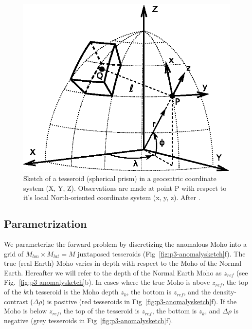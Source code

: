 \begin{figure}
    \centering
    \includegraphics{figures/paper-moho/tesseroid-coord-sys}
    \caption{Sketch of a tesseroid (spherical prism) in a geocentric coordinate
        system (X, Y, Z).
        Observations are made at point P with respect to it's local
        North-oriented coordinate system (x, y, z).
        After \citet{uieda2015}.
    }
    \label{fig:p3-tesseroid}
\end{figure}


\subsection{Parametrization}

We parameterize the forward problem by discretizing the anomalous Moho
into a grid of $M_{lon} \times M_{lat} = M$ juxtaposed tesseroids
(Fig~\ref{fig:p3-anomalysketch}f).
The true (real Earth) Moho varies in depth
with respect to the Moho of the Normal Earth.
Hereafter we will refer to the depth of the Normal Earth Moho as $z_{ref}$
(see Fig.~\ref{fig:p3-anomalysketch}b).
In cases where the true Moho is above $z_{ref}$,
the top of the $k$th tesseroid is the Moho depth $z_{k}$,
the bottom is $z_{ref}$, and the density-contrast ($\Delta\rho$) is positive
(red tesseroids in Fig~\ref{fig:p3-anomalysketch}f).
If the Moho is below $z_{ref}$, the top of the tesseroid is $z_{ref}$,
the bottom is $z_k$, and $\Delta\rho$ is negative
(grey tesseroids in Fig~\ref{fig:p3-anomalysketch}f).

